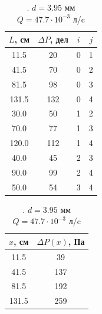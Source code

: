 \documentclass[a4paper]{article}
\begin{document}
\begin{itemize}
\begin{table}[]
\begin{minipage}{0.49\linewidth}
\centering
\begin{tabular}{|c|c|c|c|}
\hline
$L$, см & $\Delta P$, дел & $i$ & $j$ \\ \hline
11.5    & 20              & 0   & 1   \\ \hline
41.5    & 70              & 0   & 2   \\ \hline
81.5    & 98              & 0   & 3   \\ \hline
131.5   & 132             & 0   & 4   \\ \hline
30.0    & 50              & 1   & 2   \\ \hline
70.0    & 77              & 1   & 3   \\ \hline
120.0   & 112             & 1   & 4   \\ \hline
40.0    & 45              & 2   & 3   \\ \hline
90.0    & 99              & 2   & 4   \\ \hline
50.0    & 54              & 3   & 4   \\ \hline
\end{tabular}
\caption{. \newline $d = 3.95$ мм \newline $Q = 47.7 \cdot 10^{-3}$ л/c}
\end{minipage}
\begin{minipage}{0.49\linewidth}
\centering
\begin{tabular}{|c|c|}
\hline
$x$, см & $\Delta P(x)$, Па \\ \hline
11.5    & 39                \\ \hline
41.5    & 137               \\ \hline
81.5    & 192               \\ \hline
131.5   & 259               \\ \hline
\end{tabular}
\caption{. \newline $d = 3.95$ мм \newline $Q = 47.7 \cdot 10^{-3}$ л/c}
\end{minipage}
\end{table}


\end{itemize}
\end{document}

